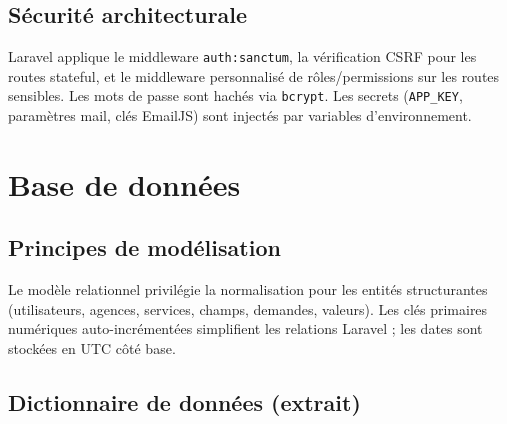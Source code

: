 \subsection{Sécurité architecturale}

Laravel applique le middleware \texttt{auth:sanctum}, la vérification CSRF pour les routes stateful, et le middleware personnalisé de rôles/permissions sur les routes sensibles. Les mots de passe sont hachés via \texttt{bcrypt}. Les secrets (\texttt{APP\_KEY}, paramètres mail, clés EmailJS) sont injectés par variables d'environnement.

\section{Base de données}

\subsection{Principes de modélisation}

Le modèle relationnel privilégie la normalisation pour les entités structurantes (utilisateurs, agences, services, champs, demandes, valeurs). Les clés primaires numériques auto-incrémentées simplifient les relations Laravel ; les dates sont stockées en UTC côté base.

\newpage

\renewcommand{\arraystretch}{1.3}

\subsection{Dictionnaire de données (extrait)}


